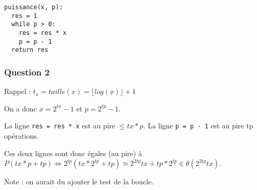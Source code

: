 \begin{verbatim}
puissance(x, p):
  res = 1
  while p > 0:
    res = res * x
    p = p - 1
  return res
\end{verbatim}

\hypertarget{question-2-1}{%
\subsubsection{Question 2}\label{question-2-1}}

Rappel : \(t_x = taille(x) = \lfloor log(x) \rfloor + 1\)

On a donc \(x = 2^{tx}-1\) et \(p=2^{tp}-1\).

La ligne \texttt{res\ =\ res\ *\ x} est au pire \(\leqslant tx * p\). La
ligne \texttt{p\ =\ p\ -\ 1} est au pire tp opérations.

Ces deux lignes sont donc égales (au pire) à
\(P(tx*p+tp) \iff 2^{tp}(tx*2^{tp}+tp) \simeq 2^{2tp}tx+tp*2^{tp} \in \theta(2^{2tp}tx)\).

Note : on aurait du ajouter le test de la boucle.
